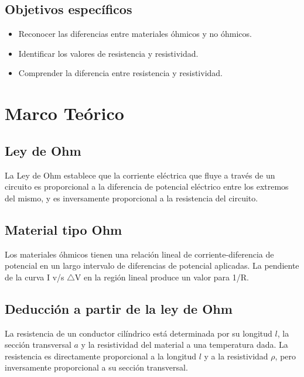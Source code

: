 \documentclass[10pt]{article}
\begin{document}
\begin{multicols}{2}
	\subsection{Objetivos específicos}
	
	\begin{itemize}
		\item Reconocer las diferencias entre materiales óhmicos y no óhmicos.
		\item Identificar los valores de resistencia y resistividad.
		\item Comprender la diferencia entre resistencia y resistividad.
	\end{itemize}



	\section{Marco Teórico}

	\subsection*{Ley de Ohm}

	La Ley de Ohm establece que la corriente eléctrica que fluye a través de un
	circuito es proporcional a la diferencia de potencial eléctrico entre los
	extremos del mismo, y es inversamente proporcional a la resistencia del
	circuito.~\cite{LeyDeOhm}

	\subsection*{Material tipo Ohm}

	Los materiales óhmicos tienen una relación lineal de corriente-diferencia de
	potencial en un largo intervalo de diferencias de potencial aplicadas.
	La pendiente de la curva I v/s $\triangle$V en la región lineal produce un
	valor para 1/R.~\cite{MaterialesOhmicos}

	\subsection*{Deducción a partir de la ley de Ohm}

	La resistencia de un conductor cilíndrico está determinada por su longitud $l$,
	la sección transversal $a$ y la resistividad del material a una temperatura dada.
	La resistencia es directamente proporcional a la longitud $l$ y a la
	resistividad $\rho$, pero inversamente proporcional a su sección transversal.


\end{multicols}
\end{document}
